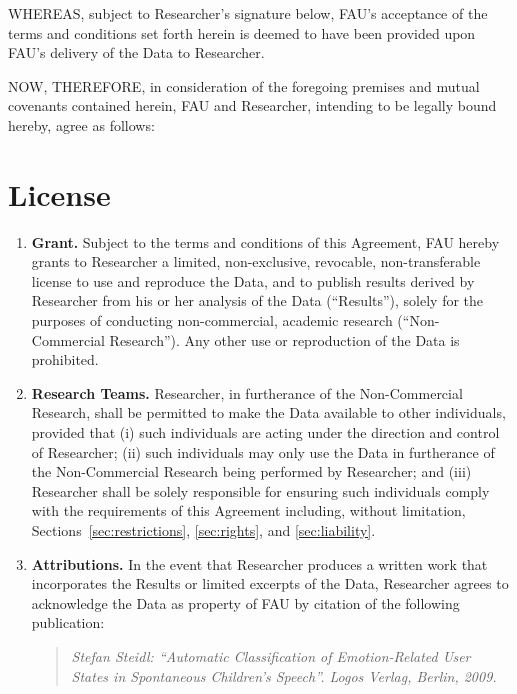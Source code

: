 \documentclass[11pt]{article}
\begin{document}
\begin{Form}
  WHEREAS, subject to Researcher's signature below, FAU's acceptance of the terms and conditions set forth herein is deemed to have been provided upon FAU's delivery of the Data to Researcher.

  NOW, THEREFORE, in consideration of the foregoing premises and mutual covenants contained herein, FAU and Researcher, intending to be legally bound hereby, agree as follows:

  \clearpage

  \section{License}
  \label{sec:license}

  \begin{enumerate}[label=\alph*)]
    \item \textbf{Grant.} 
      Subject to the terms and conditions of this Agreement, FAU hereby grants to Researcher a limited, non-exclusive, revocable, non-transferable license to use and reproduce the Data, and to publish results derived by Researcher from his or her analysis of the Data (``Results''), solely for the purposes of conducting non-commercial, academic research (``Non-Commercial Research''). 
      Any other use or reproduction of the Data is prohibited.
    \item \textbf{Research Teams.}
      Researcher, in furtherance of the Non-Commercial Research, shall be permitted to make the Data available to other individuals, provided that (i) such individuals are acting under the direction and control of Researcher; (ii) such individuals may only use the Data in furtherance of the Non-Commercial Research being performed by Researcher; and (iii) Researcher shall be solely responsible for ensuring such individuals comply with the requirements of this Agreement including, without limitation, Sections~\ref{sec:restrictions}, \ref{sec:rights}, and \ref{sec:liability}.
    \item \textbf{Attributions.}  
      In the event that Researcher produces a written work that incorporates the Results or limited excerpts of the Data,
      Researcher agrees to acknowledge the Data as property of FAU by  
      citation of the following publication:
      \begin{quote}
        \emph{Stefan Steidl: ``Automatic Classification of Emotion-Related User States in Spontaneous Children's Speech''. Logos Verlag, Berlin, 2009.}
      \end{quote}
  \end{enumerate}


\end{Form}
\end{document}
